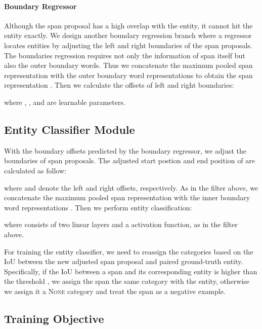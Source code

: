 \documentclass[11pt,a4paper]{article}
\begin{document}
\paragraph{Boundary Regressor}

Although the span proposal has a high overlap with the entity, it cannot hit the entity exactly. We design another boundary regression branch where a regressor locates entities by adjusting the left and right boundaries of the span proposals. The boundaries regression requires not only the information of span itself but also the outer boundary words. Thus we concatenate the maximum pooled span representation  with the outer boundary word representations  to obtain the span representation . Then we calculate the offsets  of left and right boundaries:




\noindent where , ,  and  are learnable parameters.


\subsection{Entity Classifier Module}

With the boundary offsets  predicted by the boundary regressor, we adjust the boundaries of span proposals. The adjusted start postion  and end position  of  are calculated as follow:




\noindent where  and  denote the left and right offsets, respectively. As in the filter above, we concatenate the maximum pooled span representation  with the inner boundary word representations . Then we perform entity classification:





\noindent where  consists of two linear layers and a  activation function, as in the filter above.

For training the entity classifier, we need to reassign the categories based on the IoU between the new adjusted span proposal and paired ground-truth entity. Specifically, if the IoU between a span and its corresponding entity is higher than the threshold , we assign the span the same category with the entity, otherwise we assign it a \textsc{None} category and treat the span as a negative example. 

\subsection{Training Objective}
\end{document}
